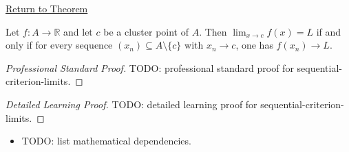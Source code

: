 \newpage
{}
\label{prf:sequential-criterion-limits}

\begin{remark*}[Return]
\hyperref[prop:sequential-criterion-limits]{Return to Theorem}
\end{remark*}

\begin{theorem*}
Let $f : A \to \mathbb{R}$ and let $c$ be a cluster point of $A$.
Then $\lim_{x\to c}f(x)=L$ if and only if for every sequence
$(x_n)\subseteq A\setminus\{c\}$ with $x_n\to c$, one has
$f(x_n)\to L$.

\smallskip\noindent
\end{theorem*}

\begin{proof}[Professional Standard Proof]
\LRAProofBodyStart
TODO: professional standard proof for sequential-criterion-limits.
\end{proof}

\begin{proof}[Detailed Learning Proof]
\LRAProofBodyStart
TODO: detailed learning proof for sequential-criterion-limits.
\end{proof}

\begin{remark*}
\end{remark*}

\begin{dependencies}
\begin{itemize}
  \item TODO: list mathematical dependencies.
\end{itemize}
\end{dependencies}

\clearpage
